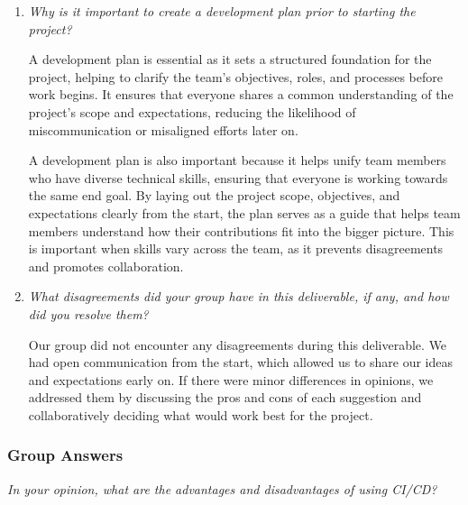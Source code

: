 \documentclass{article}
\begin{document}
\begin{enumerate}
  \item \textit{Why is it important to create a development plan prior to starting the project?}

  A development plan is essential as it sets a structured foundation for the project, helping to 
  clarify the team's objectives, roles, and processes before work begins. It ensures that everyone 
  shares a common understanding of the project's scope and expectations, reducing the likelihood 
  of miscommunication or misaligned efforts later on. 

  A development plan is also important because it helps unify team members who have diverse technical 
  skills, ensuring that everyone is working towards the same end goal. By laying out the project scope, 
  objectives, and expectations clearly from the start, the plan serves as a guide that helps team 
  members understand how their contributions fit into the bigger picture. This is important when 
  skills vary across the team, as it prevents disagreements and promotes collaboration.

  \item \textit{What disagreements did your group have in this deliverable, if any, and how did you resolve them?}

  Our group did not encounter any disagreements during this deliverable. We had open communication from 
  the start, which allowed us to share our ideas and expectations early on. If there were minor differences 
  in opinions, we addressed them by discussing the pros and cons of each suggestion and collaboratively 
  deciding what would work best for the project.

\end{enumerate}

\subsubsection*{Group Answers}

\textit{In your opinion, what are the advantages and disadvantages of using CI/CD?}
  
\end{document}
